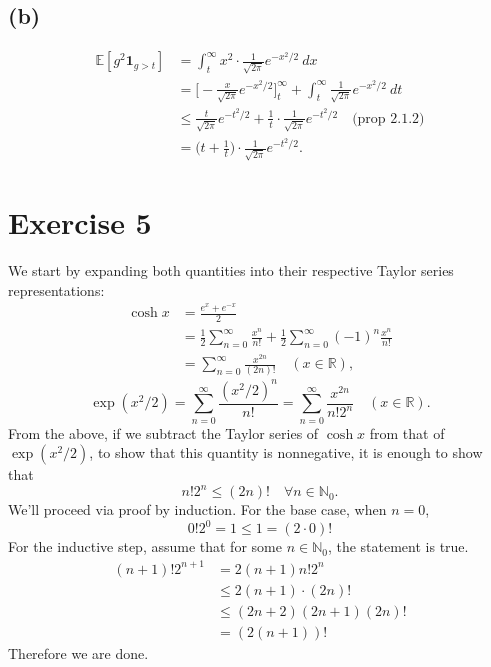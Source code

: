 \subsection*{(b)}
\begin{align*}
	\mathbb{E}[g^2 \mathbf{1}_{g > t}] 
	&= \int_{t}^{\infty} x^2 \cdot \frac{1}{\sqrt{2 \pi}} e^{-x^2 / 2} \ dx \\
	&= \biggl[ -\frac{x}{\sqrt{2 \pi}} e^{-x^2 / 2} \biggr]_t^\infty 
	+ \int_{t}^{\infty} \frac{1}{\sqrt{2 \pi}} e^{-x^2 / 2} \ dt \\
	&\leq \frac{t}{\sqrt{2 \pi}} e^{-t^2 / 2} + \frac{1}{t} \cdot 
	\frac{1}{\sqrt{2 \pi}} e^{-t^2 / 2} \quad \text{(prop 2.1.2)} \\
	&= \biggl( t + \frac{1}{t} \biggr) \cdot \frac{1}{\sqrt{2 \pi}} e^{-t^2 / 2}.
\end{align*}


\newpage
\section*{Exercise 5}
We start by expanding both quantities into their respective Taylor series representations: 
\begin{align*}
	\cosh{x} 
	&= \frac{e^x + e^{-x}}{2} \\
	&= \frac{1}{2}\sum_{n = 0}^{\infty} \frac{x^n}{n!} + \frac{1}{2}\sum_{n = 0}^{\infty} 
	(-1)^n \frac{x^n}{n!} \\
	&= \sum_{n = 0}^{\infty} \frac{x^{2n}}{(2n)!} \quad (x \in \mathbb{R}),
\end{align*}
\[ \exp{(x^2 / 2)} = \sum_{n = 0}^{\infty} \frac{(x^2 / 2)^n}{n!} 
= \sum_{n = 0}^{\infty} \frac{x^{2n}}{n! 2^n} \quad (x \in \mathbb{R}). \]
From the above, if we subtract the Taylor series of $\cosh{x}$ from that of $\exp{(x^2 / 2)}$, to show 
that this quantity is nonnegative, it is enough to show that 
\[ n! 2^n \leq (2n)! \quad \forall n \in \mathbb{N}_0. \]
We'll proceed via proof by induction. For the base case, when $n = 0$, 
\[ 0! 2^0 = 1 \leq 1 = (2 \cdot 0)! \]
For the inductive step, assume that for some $n \in \mathbb{N}_0$, the statement is true.
\begin{align*}
	(n + 1)! 2^{n + 1} 
	&= 2(n + 1) n! 2^n \\
	&\leq 2(n + 1) \cdot (2n)! \\
	&\leq (2n + 2)(2n + 1)(2n)! \\
	&= (2(n + 1))!
\end{align*}
Therefore we are done.


\newpage
